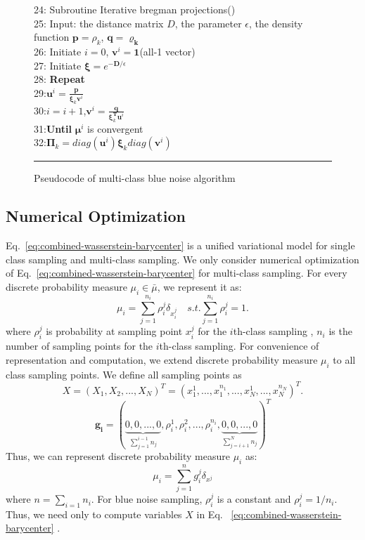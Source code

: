 \begin{figure}[htb]
24: Subroutine Iterative bregman projections()\\
25: Input: the distance matrix $D$, the parameter $\epsilon$,
    the density function $\mathbf{p}=\rho_k$,
    $\mathbf{q}=\mathbf{\varrho_{k}}$\\
26: Initiate $i=0$, $\mathbf{v}^i=\mathbf{1}$(all-1 vector)\\
27: Initiate $\mathbf\xi=e^{-\mathbf{D}/\epsilon}$\\
28: \textbf{Repeat}\\
29:\quad $\mathbf{u}^i=\frac{\mathbf{p}}{\mathbf{\xi}_k\mathbf{v}^i}$\\
30:\quad $i=i+1$,$\mathbf{v}^i=\frac{\mathbf{q}}{\mathbf{\xi}_k^\mathbf{T}\mathbf{u}^i}$\\
31:\textbf{Until} $\mathbf{\mu}^i$ is convergent\\
32:$\mathbf{\Pi}_k=diag(\mathbf{u}^i)\mathbf{\xi}_k diag({\mathbf{v}^i})$\\
   \rule{0.47\textwidth}{0.5pt}
  \caption{Pseudocode of multi-class blue noise algorithm}\label{fig:pseudocode}
\end{figure}


\subsection{Numerical Optimization}
Eq.~\ref{eq:combined-wasserstein-barycenter} is a unified variational model for single class sampling and multi-class sampling.
We only consider numerical optimization of Eq.~\ref{eq:combined-wasserstein-barycenter}
for multi-class sampling.
For every discrete probability measure $\mu_i\in\bar\mu$,
we represent it as:
\begin{equation}
 \mu_i=\sum\limits_{j=1}^{n_i}\rho_i^j\delta_{x_i^j} \quad s.t. \sum\limits_{j=1}^{n_i}\rho_i^j=1.
\end{equation}
where $\rho_i^j$ is probability at sampling point $x_i^j$ for the $i$th-class sampling
, $n_i$ is the number of sampling points for the $i$th-class sampling.
For convenience of representation and computation,
we extend discrete probability measure $\mu_i$ to all class sampling points.
We define all sampling points as
\begin{equation}
 X=(X_1,X_2,...,X_N)^T=(x_1^1,...,x_1^{n_1},...,x_N^1,...,x_N^{n_N})^T.
\end{equation}
\begin{equation}
\mathbf{g_i}=(\underbrace{0,0,...,0}_{\sum\limits_{j=1}^{i-1}n_j},\rho_i^1,\rho_i^2,...,\rho_i^{n_i},\underbrace{0,0,...,0}_{\sum\limits_{j=i+1}^{N}n_j})^T
\end{equation}
Thus,
we can represent discrete probability measure $\mu_i$ as:
\begin{equation}
  \mu_i=\sum\limits_{j=1}^{n}g_i^j\delta_{x^j}
\end{equation}
where $n=\sum\limits_{i=1}{n_i}$.
For blue noise sampling,
$\rho_i^j$ is a constant and $\rho_i^j=1/n_i$.
Thus, we need only to compute variables $X$ in Eq. ~\ref{eq:combined-wasserstein-barycenter} .

